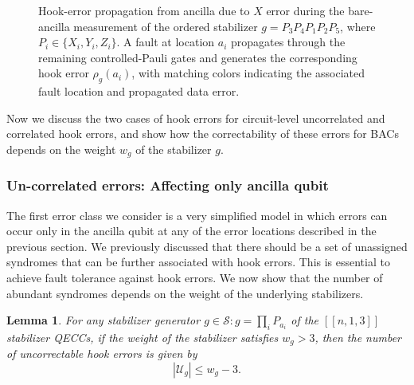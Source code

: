 \documentclass[reprint, amsmath,amssymb, aps,pra,
 floatfix,
]{revtex4-2}
\newtheorem{lemma}[theorem]{Lemma}
\begin{document}
\begin{figure}[t]
{\begin{quantikz}[row sep=0.30cm]
\end{quantikz}
}
\caption{Hook-error propagation from ancilla due to $X$ error
during the bare-ancilla measurement of the ordered stabilizer 
$g=P_3P_4P_1P_2P_5$, where $P_i\in\{X_i,Y_i,Z_i\}$.
A fault at location $a_i$ propagates through the remaining controlled-Pauli gates and generates the corresponding hook error $\rho_g(a_i)$, with matching colors indicating the associated fault location and propagated data error.}
    \label{fig: measure syndrome faliure1}
\end{figure}
\noindent Now we discuss the two cases of hook errors for circuit-level uncorrelated and correlated hook errors, and show how the correctability of these errors for BACs depends on the weight $w_g$ of the stabilizer $g$. 

\subsubsection{Un-correlated errors: Affecting only ancilla qubit}
\noindent The first error class we consider is a very simplified model in which errors can occur only in the ancilla qubit at any of the error locations described in the previous section. 
We previously discussed that there should be a set of unassigned syndromes that can be further associated with hook errors.
This is essential to achieve fault tolerance against hook errors.
We now show that the number of abundant syndromes depends on the weight of the underlying stabilizers.
\begin{lemma}
\label{lemma:one qubit error}
For any stabilizer generator $g \in \mathcal{S} : g= \prod_{i} P_{a_i}$ of the $[[n,1,3]]$ stabilizer QECCs, if the weight of the stabilizer satisfies $w_g > 3$, then the number of uncorrectable hook errors is given by
\begin{equation*}
|\mathcal{U}_g|\leq w_g-3.
\end{equation*}
\end{lemma}
\end{document}
